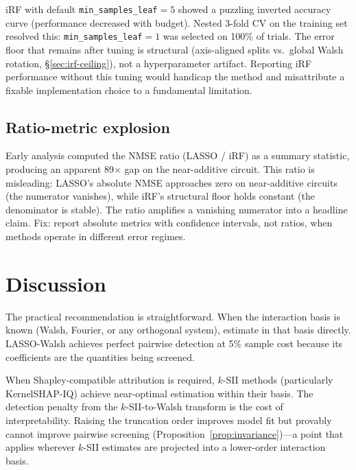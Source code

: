 \documentclass[10pt]{article}
\begin{document}
iRF with default \texttt{min\_samples\_leaf}$=5$ showed a puzzling
inverted accuracy curve (performance decreased with budget). Nested
3-fold CV on the training set resolved this:
\texttt{min\_samples\_leaf}$=1$ was selected on 100\% of trials.
The error floor that remains after tuning is structural
(axis-aligned splits vs.\ global Walsh rotation,
\S\ref{sec:irf-ceiling}), not a hyperparameter artifact.
Reporting iRF performance without this tuning would handicap the
method and misattribute a fixable implementation choice to a
fundamental limitation.

\subsection{Ratio-metric explosion}

Early analysis computed the NMSE ratio (LASSO / iRF) as a summary
statistic, producing an apparent 89$\times$ gap on the near-additive
circuit. This ratio is misleading: LASSO's absolute NMSE approaches
zero on near-additive circuits (the numerator vanishes), while
iRF's structural floor holds constant (the denominator is stable).
The ratio amplifies a vanishing numerator into a headline claim.
Fix: report absolute metrics with confidence intervals, not ratios,
when methods operate in different error regimes.


\section{Discussion}
\label{sec:discussion}

The practical recommendation is straightforward. When the
interaction basis is known (Walsh, Fourier, or any orthogonal
system), estimate in that basis directly. LASSO-Walsh achieves
perfect pairwise detection at 5\% sample cost because its
coefficients are the quantities being screened.

When Shapley-compatible attribution is required, $k$-SII methods
(particularly KernelSHAP-IQ) achieve near-optimal estimation
within their basis. The detection penalty from the
$k$-SII-to-Walsh transform is the cost of interpretability.
Raising the truncation order improves model fit but provably
cannot improve pairwise screening
(Proposition~\ref{prop:invariance})---a point that applies
wherever $k$-SII estimates are projected into a lower-order
interaction basis.
\end{document}
